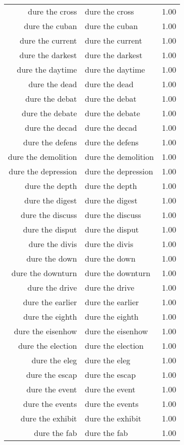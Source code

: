 \begin{table}[ht]
\begin{tabular}{rlr}
  dure the cross & dure the cross & 1.00 \\ 
  dure the cuban & dure the cuban & 1.00 \\ 
  dure the current & dure the current & 1.00 \\ 
  dure the darkest & dure the darkest & 1.00 \\ 
  dure the daytime & dure the daytime & 1.00 \\ 
  dure the dead & dure the dead & 1.00 \\ 
  dure the debat & dure the debat & 1.00 \\ 
  dure the debate & dure the debate & 1.00 \\ 
  dure the decad & dure the decad & 1.00 \\ 
  dure the defens & dure the defens & 1.00 \\ 
  dure the demolition & dure the demolition & 1.00 \\ 
  dure the depression & dure the depression & 1.00 \\ 
  dure the depth & dure the depth & 1.00 \\ 
  dure the digest & dure the digest & 1.00 \\ 
  dure the discuss & dure the discuss & 1.00 \\ 
  dure the disput & dure the disput & 1.00 \\ 
  dure the divis & dure the divis & 1.00 \\ 
  dure the down & dure the down & 1.00 \\ 
  dure the downturn & dure the downturn & 1.00 \\ 
  dure the drive & dure the drive & 1.00 \\ 
  dure the earlier & dure the earlier & 1.00 \\ 
  dure the eighth & dure the eighth & 1.00 \\ 
  dure the eisenhow & dure the eisenhow & 1.00 \\ 
  dure the election & dure the election & 1.00 \\ 
  dure the eleg & dure the eleg & 1.00 \\ 
  dure the escap & dure the escap & 1.00 \\ 
  dure the event & dure the event & 1.00 \\ 
  dure the events & dure the events & 1.00 \\ 
  dure the exhibit & dure the exhibit & 1.00 \\ 
  dure the fab & dure the fab & 1.00 \\ 

\end{tabular}
\end{table}
